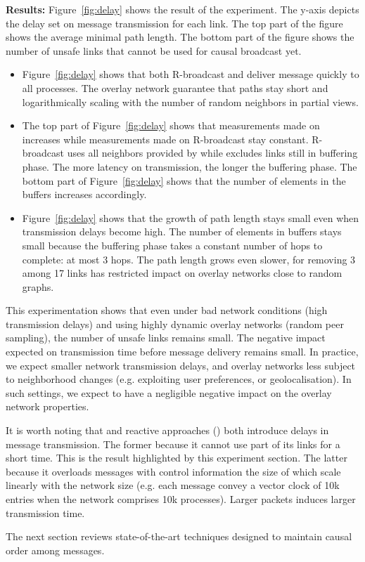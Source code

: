 \noindent \textbf{Results:} Figure~\ref{fig:delay} shows the result of the
experiment. The y-axis depicts the delay set on message transmission for each
link. The top part of the figure shows the average minimal path length. The
bottom part of the figure shows the number of unsafe links that cannot be used 
for causal broadcast yet.
\begin{itemize}[leftmargin=*]
\item Figure~\ref{fig:delay} shows that both R-broadcast and \CBROADCAST deliver
  message quickly to all processes. The overlay network guarantee that paths
  stay short and logarithmically scaling with the number of random neighbors in
  partial views.
\item The top part of Figure~\ref{fig:delay} shows that measurements made on
  \CBROADCAST increases while measurements made on R-broadcast stay
  constant. R-broadcast uses all neighbors provided by \SPRAY while \CBROADCAST
  excludes links still in buffering phase. The more latency on transmission, the
  longer the buffering phase. The bottom part of Figure~\ref{fig:delay} shows
  that the number of elements in the buffers increases accordingly.
\item Figure~\ref{fig:delay} shows that the growth of path length stays small
  even when transmission delays become high. The number of elements in buffers
  stays small because the buffering phase takes a constant number of hops to
  complete: at most 3 hops. The path length grows even slower, for removing 3
  among 17 links has restricted impact on overlay networks close to random
  graphs.
\end{itemize}

This experimentation shows that even under bad network conditions (high
transmission delays) and using highly dynamic overlay networks (random peer
sampling), the number of unsafe links remains small. The negative impact
expected on transmission time before message delivery remains small. In
practice, we expect smaller network transmission delays, and overlay networks
less subject to neighborhood changes (e.g. exploiting user preferences, or
geolocalisation). In such settings, we expect \CBROADCAST to have a negligible
negative impact on the overlay network properties. 

It is worth noting that \CBROADCAST and reactive approaches (\REF) both
introduce delays in message transmission. The former because it cannot use part
of its links for a short time. This is the result highlighted by this experiment
section.  The latter because it overloads messages with control information the
size of which scale linearly with the network size (e.g. each message convey a
vector clock of 10k entries when the network comprises 10k processes).  Larger
packets induces larger transmission time. 

The next section reviews state-of-the-art techniques designed to maintain causal
order among messages.

